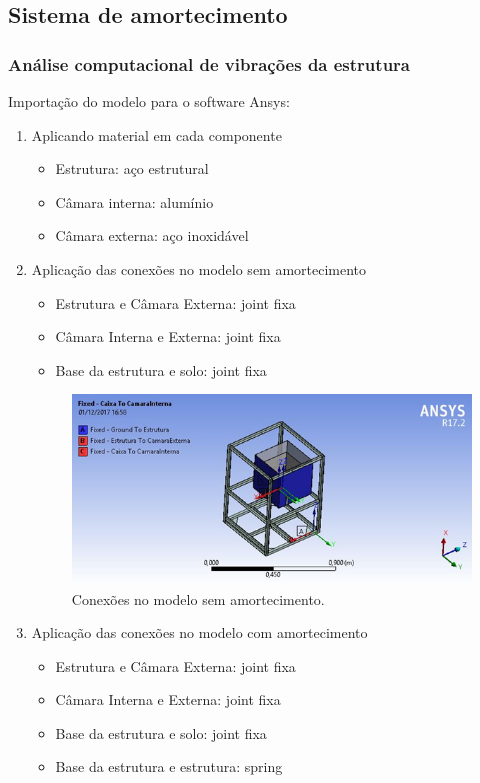 \subsection{Sistema de amortecimento}

\subsubsection{Análise computacional de vibrações da estrutura}

\noindent Importação do modelo para o software Ansys:

\begin{enumerate}
	\item Aplicando material em cada componente
	\begin{itemize}
		\item Estrutura: aço estrutural
		\item Câmara interna: alumínio
		\item Câmara externa: aço inoxidável
	\end{itemize}
	\item Aplicação das conexões no modelo sem amortecimento
	\begin{itemize}
		\item Estrutura e Câmara Externa: joint fixa
		\item Câmara Interna e Externa: joint fixa
		\item Base da estrutura e solo: joint fixa
	\end{itemize}
	
	\begin{figure}[H]
		\centering
		\includegraphics[width=350pt]{figuras/conexoes_sem_amortecimento.png}
		\caption{Conexões no modelo sem amortecimento.}
	\end{figure}
	
	\item Aplicação das conexões no modelo com amortecimento
	\begin{itemize}
		\item Estrutura e Câmara Externa: joint fixa
		\item Câmara Interna e Externa: joint fixa
		\item Base da estrutura e solo: joint fixa
		\item Base da estrutura e estrutura: spring
	\end{itemize} 
	

\end{enumerate}
